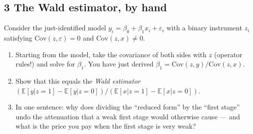 \documentclass[11pt]{article}
\newcommand{\E}{\mathbb{E}}
\newcommand{\Cov}{\mathrm{Cov}}
\begin{document}
\subsection*{3 The Wald estimator, by hand}

Consider the just-identified model $y_{i} = \beta_{0} + \beta_{1} x_{i} +
\varepsilon_{i}$ with a binary instrument $z_{i}$ satisfying $\Cov(z, \varepsilon) = 0$
and $\Cov(z, x) \neq 0$.
\begin{enumerate}[label=(\alph*)]
\item Starting from the model, take the covariance of both sides with $z$ (operator
rules!) and solve for $\beta_{1}$. You have just derived
$\beta_{1} = \Cov(z, y)/\Cov(z, x)$.
\item Show that this equals the \emph{Wald estimator}
$\left(\E[y|z=1] - \E[y|z=0]\right) / \left(\E[x|z=1] - \E[x|z=0]\right)$.
\item In one sentence: why does dividing the ``reduced form'' by the ``first stage''
undo the attenuation that a weak first stage would otherwise cause --- and what is the
price you pay when the first stage is very weak?
\end{enumerate}
\end{document}
